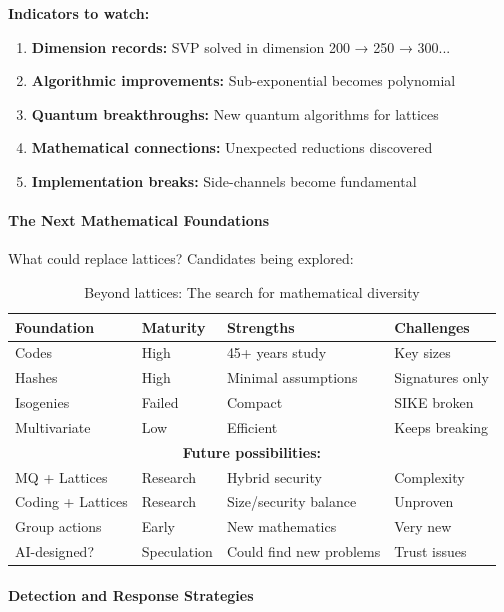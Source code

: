 \documentclass[11pt,a4paper]{article}
\begin{document}
\textbf{Indicators to watch:}
\begin{enumerate}
    \item \textbf{Dimension records:} SVP solved in dimension 200 → 250 → 300...
    \item \textbf{Algorithmic improvements:} Sub-exponential becomes polynomial
    \item \textbf{Quantum breakthroughs:} New quantum algorithms for lattices
    \item \textbf{Mathematical connections:} Unexpected reductions discovered
    \item \textbf{Implementation breaks:} Side-channels become fundamental
\end{enumerate}

\paragraph{The Next Mathematical Foundations}

What could replace lattices? Candidates being explored:

\begin{table}[h]
\centering
\begin{tabular}{|l|l|l|l|}
\hline
\textbf{Foundation} & \textbf{Maturity} & \textbf{Strengths} & \textbf{Challenges} \\
\hline
Codes & High & 45+ years study & Key sizes \\
Hashes & High & Minimal assumptions & Signatures only \\
Isogenies & Failed & Compact & SIKE broken \\
Multivariate & Low & Efficient & Keeps breaking \\
\hline
\multicolumn{4}{|c|}{\textbf{Future possibilities:}} \\
\hline
MQ + Lattices & Research & Hybrid security & Complexity \\
Coding + Lattices & Research & Size/security balance & Unproven \\
Group actions & Early & New mathematics & Very new \\
AI-designed? & Speculation & Could find new problems & Trust issues \\
\hline
\end{tabular}
\caption{Beyond lattices: The search for mathematical diversity}
\end{table}

\paragraph{Detection and Response Strategies}
\end{document}
